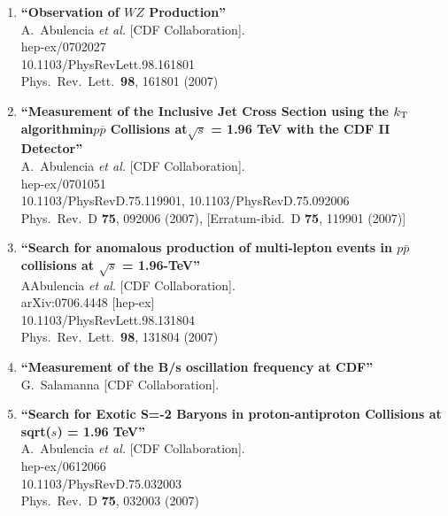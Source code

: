 \documentclass{article}
\begin{document}
\begin{enumerate}
\item%
{\bf ``Observation of $WZ$ Production''}
  \\{}A.~Abulencia {\it et al.}  [CDF Collaboration].
  \\{}hep-ex/0702027
    \\{}10.1103/PhysRevLett.98.161801
\\{}Phys.\ Rev.\ Lett.\  {\bf 98}, 161801 (2007) %


\item%
{\bf ``Measurement of the Inclusive Jet Cross Section using the {\boldmath $k_{\rm T}$} algorithmin{\boldmath $p\overline{p}$} Collisions at{\boldmath $\sqrt{s}$} = 1.96 TeV with the CDF II Detector''}
  \\{}A.~Abulencia {\it et al.}  [CDF Collaboration].
  \\{}hep-ex/0701051
    \\{}10.1103/PhysRevD.75.119901, 10.1103/PhysRevD.75.092006
\\{}Phys.\ Rev.\ D {\bf 75}, 092006 (2007), [Erratum-ibid.\ D {\bf 75}, 119901 (2007)] %


\item%
{\bf ``Search for anomalous production of multi-lepton events in $p \bar{p}$ collisions at $\sqrt{s}$ = 1.96-TeV''}
  \\{}AAbulencia {\it et al.}  [CDF Collaboration].
  \\{}arXiv:0706.4448 [hep-ex]
    \\{}10.1103/PhysRevLett.98.131804
\\{}Phys.\ Rev.\ Lett.\  {\bf 98}, 131804 (2007) %


\item%
{\bf ``Measurement of the B/s oscillation frequency at CDF''}
  \\{}G.~Salamanna [CDF Collaboration].
  



\item%
{\bf ``Search for Exotic S=-2 Baryons in proton-antiproton Collisions at sqrt($s$) = 1.96 TeV''}
  \\{}A.~Abulencia {\it et al.}  [CDF Collaboration].
  \\{}hep-ex/0612066
    \\{}10.1103/PhysRevD.75.032003
\\{}Phys.\ Rev.\ D {\bf 75}, 032003 (2007) %



\end{enumerate}
\end{document}
